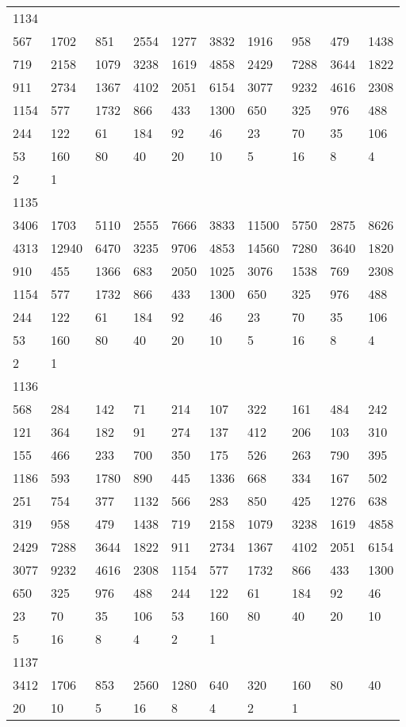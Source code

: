 \begin{longtable}{*{10}{l}}
1134&&&&&&&&&\\
567& 1702& 851& 2554& 1277& 3832& 1916& 958& 479& 1438\\
719& 2158& 1079& 3238& 1619& 4858& 2429& 7288& 3644& 1822\\
911& 2734& 1367& 4102& 2051& 6154& 3077& 9232& 4616& 2308\\
1154& 577& 1732& 866& 433& 1300& 650& 325& 976& 488\\
244& 122& 61& 184& 92& 46& 23& 70& 35& 106\\
53& 160& 80& 40& 20& 10& 5& 16& 8& 4\\
2& 1& \\

1135&&&&&&&&&\\
3406& 1703& 5110& 2555& 7666& 3833& 11500& 5750& 2875& 8626\\
4313& 12940& 6470& 3235& 9706& 4853& 14560& 7280& 3640& 1820\\
910& 455& 1366& 683& 2050& 1025& 3076& 1538& 769& 2308\\
1154& 577& 1732& 866& 433& 1300& 650& 325& 976& 488\\
244& 122& 61& 184& 92& 46& 23& 70& 35& 106\\
53& 160& 80& 40& 20& 10& 5& 16& 8& 4\\
2& 1& \\

1136&&&&&&&&&\\
568& 284& 142& 71& 214& 107& 322& 161& 484& 242\\
121& 364& 182& 91& 274& 137& 412& 206& 103& 310\\
155& 466& 233& 700& 350& 175& 526& 263& 790& 395\\
1186& 593& 1780& 890& 445& 1336& 668& 334& 167& 502\\
251& 754& 377& 1132& 566& 283& 850& 425& 1276& 638\\
319& 958& 479& 1438& 719& 2158& 1079& 3238& 1619& 4858\\
2429& 7288& 3644& 1822& 911& 2734& 1367& 4102& 2051& 6154\\
3077& 9232& 4616& 2308& 1154& 577& 1732& 866& 433& 1300\\
650& 325& 976& 488& 244& 122& 61& 184& 92& 46\\
23& 70& 35& 106& 53& 160& 80& 40& 20& 10\\
5& 16& 8& 4& 2& 1& \\

1137&&&&&&&&&\\
3412& 1706& 853& 2560& 1280& 640& 320& 160& 80& 40\\
20& 10& 5& 16& 8& 4& 2& 1& \\


\end{longtable}
